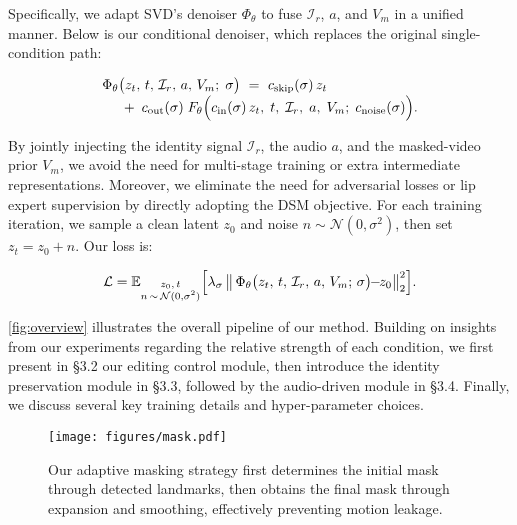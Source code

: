 Specifically, we adapt SVD's denoiser $\Phi_{\theta}$ to fuse $\mathcal{I}_r$, $a$, and $V_m$ in a unified manner.
Below is our conditional denoiser, which replaces the original single-condition path:
\begin{small}
\begin{align}
\setlength{\abovedisplayskip}{0pt}
&\Phi_\theta\bigl(z_t,\,t,\,\mathcal{I}_r,\,a,\,V_m;\;\sigma\bigr)
~=~
c_{\mathrm{skip}}(\sigma)\,z_t 
\nonumber\\[-3pt]
&\quad~+\;
c_{\mathrm{out}}(\sigma)\;
F_\theta\Bigl(
    c_{\mathrm{in}}(\sigma)\,z_t,\;
    t,\;
    \mathcal{I}_r,\;
    a,\;
    V_m;\;
    c_{\mathrm{noise}}(\sigma)
\Bigr).
\setlength{\belowdisplayskip}{0pt}
\label{eq:ours_denoiser}
\end{align}
\end{small}
By jointly injecting the identity signal $\mathcal{I}_r$, the audio $a$, and the masked-video prior $V_m$, we avoid the need for multi-stage training or extra intermediate representations. Moreover, we eliminate the need for adversarial losses or lip expert supervision by directly adopting the DSM objective. 
For each training iteration, we sample a clean latent $z_0$ and noise $n \sim \mathcal{N}(0,\sigma^2)$, then set $z_t = z_0 + n$. 
Our loss is:
\begin{small}
\begin{align}
\setlength{\abovedisplayskip}{0pt}
\mathcal{L}
=
\mathbb{E}_{\substack{z_0,\,t\\n\,\sim\,\mathcal{N}(0,\sigma^2)}}
\Bigl[
  \lambda_{\sigma}\,
  \bigl\|\,
    \Phi_\theta\bigl(z_t,\,t,\,\mathcal{I}_r,\,a,\,V_m;\,\sigma\bigr)
    \!\! - \!\!
    z_0
  \bigr\|_2^2
\Bigr].
\label{eq:ours_dsm}
\setlength{\belowdisplayskip}{0pt}
\end{align}
\end{small}

\cref{fig:overview} illustrates the overall pipeline of our method.
Building on insights from our experiments regarding the relative strength of each condition, 
we first present in \S3.2 our editing control module, 
then introduce the identity preservation module in \S3.3, 
followed by the audio-driven module in \S3.4.
Finally, we discuss several key training details and hyper-parameter choices.
\begin{figure}[!htp]
\setlength{\abovecaptionskip}{0.cm}
\setlength{\belowcaptionskip}{0.cm}
\centering
\texttt{[image: figures/mask.pdf]}
\caption{Our adaptive masking strategy first determines the initial mask through detected landmarks, then obtains the final mask through expansion and smoothing, effectively preventing motion leakage.}
\label{fig:mask}
\end{figure}

